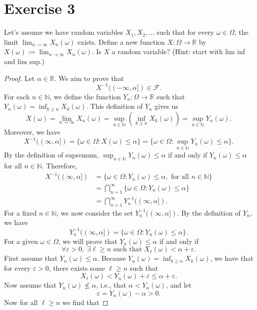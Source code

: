 \documentclass[12pt]{article}
\newenvironment{problem}
    {\begin{lrbox}{\mybox}\begin{minipage}{0.98\textwidth}}
    {\end{minipage}\end{lrbox}\framebox[\textwidth]{\usebox{\mybox}}}
\newcommand{\ds}{\displaystyle}
\let\eps\varepsilon %
\newcommand{\N}{\mathbb{N}} %
\newcommand{\R}{\mathbb{R}} %
\newcommand{\FF}{\mathcal{F}} %
\newcommand{\<}{\left\langle} %
\renewcommand{\>}{\right\rangle} %
\begin{document}
\newpage
\section*{Exercise 3}
\begin{problem}
    Let's assume we have random variables $X_1,X_2,\dots$ such that for every $\omega\in\Omega$, the limit $\ds\lim_{n\to\infty}X_n(\omega)$ exists. Define a new function $X:\Omega\to\R$ by $X(\omega):=\ds\lim_{n\to\infty}X_n(\omega)$. Is $X$ a random variable? (Hint: start with lim inf and lim sup.)
\end{problem}

\begin{proof}
    Let $\alpha\in\R$. We aim to prove that
    \[X^{-1}((-\infty,\alpha]) \in \FF.\]
    For each $n\in\N$, we define the function $Y_n : \Omega \to\R$ such that $Y_n(\omega) = \ds\inf_{k\geq n}X_k(\omega)$. This definition of $Y_n$ gives us
    \[X(\omega) = \lim_{n\to\infty}X_n(\omega) = \sup_{n\in\N}\left(\inf_{k\geq n} X_k(\omega)\right) = \sup_{n\in\N}Y_n(\omega).\]
    Moreover, we have
    \[X^{-1}((\infty,\alpha]) = \{\omega\in\Omega : X(\omega)\leq \alpha\} = \{\omega\in\Omega : \sup_{n\in\N}Y_n(\omega)\leq \alpha\}.\]
    By the definition of supremum, $\ds\sup_{n\in\N}Y_n(\omega) \leq \alpha$ if and only if $Y_n(\omega) \leq \alpha$ for all $n\in\N$. Therefore,
    \begin{align*}
        X^{-1}((\infty,\alpha])
            &= \{\omega\in\Omega : Y_n(\omega)\leq \alpha,\text{ for all } n\in\N\} \\
            &= \bigcap_{n=1}^\infty\{\omega\in\Omega : Y_n(\omega)\leq \alpha\} \\
            &= \bigcap_{n=1}^\infty Y_n^{-1}((\infty,\alpha]).
    \end{align*}
    For a fixed $n\in\N$, we now consider the set $Y_n^{-1}((\infty,\alpha])$. By the definition of $Y_n$, we have
    \[Y_n^{-1}((\infty,\alpha]) = \{\omega\in\Omega : Y_n(\omega)\leq \alpha\}.\]
    For a given $\omega\in\Omega$, we will prove that $Y_n(\omega)\leq \alpha$ if and only if
    \[\forall\eps>0,\; \exists \ell\geq n \text{ such that } X_\ell(\omega) < \alpha + \eps.\]
    First assume that $Y_n(\omega)\leq\alpha$. Because $Y_n(\omega)=\ds\inf_{k\geq n}X_k(\omega)$, we have that for every $\eps>0$, there exists some $\ell\geq n$ such that
    \[X_\ell(\omega)< Y_n(\omega) + \eps \leq \alpha+\eps.\]
    Now assume that $Y_n(\omega)\not\leq\alpha$, i.e., that $\alpha<Y_n(\omega)$, and let
    \[\eps = Y_n(\omega) - \alpha >0.\]
    Now for all $\ell\geq n$ we find that

\end{proof}
\end{document}
